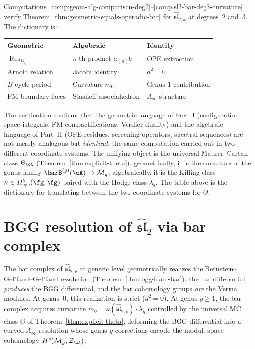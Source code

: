 \begin{remark}
\label{rem:comparison-summary}
Computations~\ref{comp:geom-alg-comparison-deg2}--\ref{comp:sl2-bar-deg3-curvature}
verify Theorem~\ref{thm:geometric-equals-operadic-bar} for
$\widehat{\mathfrak{sl}}_{2,k}$ at degrees~2 and~3.  The dictionary is:
\begin{center}
\renewcommand{\arraystretch}{1.3}
\begin{tabular}{lll}
\textbf{Geometric} & \textbf{Algebraic} & \textbf{Identity} \\
\hline
$\operatorname{Res}_{D_{ij}}$ &
  $n$-th product $a_{(n)}b$ & OPE extraction \\
Arnold relation & Jacobi identity & $d^2 = 0$ \\
$B$-cycle period & Curvature $m_0$ & Genus-1 contribution \\
FM boundary faces & Stasheff associahedron & $A_\infty$ structure \\
\end{tabular}
\end{center}
The verification confirms that the geometric language of
Part~I (configuration space integrals, FM
compactifications, Verdier duality) and the algebraic language
of Part~II (OPE residues, screening operators,
spectral sequences) are not merely analogous but
\emph{identical}: the same computation carried out in two
different coordinate systems.
The unifying object is the universal Maurer--Cartan class
$\Theta_\cA$ (Theorem~\ref{thm:explicit-theta}):
geometrically, it is the curvature of the genus family
$\barB^{(g)}(\cA) \to \overline{\mathcal{M}}_g$;
algebraically, it is the Killing class
$\kappa \in H^2_{\mathrm{cyc}}(\fg,\fg)$ paired with
the Hodge class $\lambda_g$.  The table above is the
dictionary for translating between the two coordinate
systems for $\Theta$.
\end{remark}

\section{\texorpdfstring{BGG resolution of $\widehat{\mathfrak{sl}}_2$ via bar
complex}{BGG resolution of sl-2 via bar complex}}
\label{sec:bgg-sl2-bar}

The bar complex of $\widehat{\mathfrak{sl}}_{2,k}$
at generic level geometrically realizes the Bernstein--Gel'fand--Gel'fand
resolution (Theorem~\ref{thm:bgg-from-bar}): the bar differential
\emph{produces} the BGG differential, and the bar cohomology groups
\emph{are} the Verma modules.
At genus~$0$, this realization is strict ($d^2 = 0$).
At genus $g \geq 1$, the bar complex acquires curvature
$m_0 = \kappa(\widehat{\mathfrak{sl}}_{2,k}) \cdot \lambda_g$
controlled by the universal MC class $\Theta$ of
Theorem~\ref{thm:explicit-theta}, deforming the BGG
differential into a curved $A_\infty$ resolution whose
genus-$g$ corrections encode the moduli-space cohomology
$H^*(\overline{\mathcal{M}}_g, \mathcal{Z}_\cA)$.

